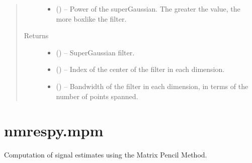 \documentclass[letterpaper,10pt,english]{sphinxmanual}
\begin{document}
\begin{fulllineitems}
\begin{quote}
\begin{description}
\begin{itemize}
\item {} 
\sphinxAtStartPar
{} (\sphinxstyleliteralemphasis{\sphinxupquote{, }}) – Power of the super\sphinxhyphen{}Gaussian. The greater the value, the more box\sphinxhyphen{}like
the filter.

\end{itemize}

\item[{Returns}] \leavevmode
\sphinxAtStartPar
\begin{itemize}
\item {} 
\sphinxAtStartPar
{} () – Super\sphinxhyphen{}Gaussian filter.

\item {} 
\sphinxAtStartPar
{} () – Index of the center of the filter in each dimension.

\item {} 
\sphinxAtStartPar
{} () – Bandwidth of the filter in each dimension, in terms of the number
of points spanned.

\end{itemize}


\end{description}\end{quote}

\end{fulllineitems}





\section{nmrespy.mpm}
\label{\detokenize{references/mpm:module-nmrespy.mpm}}\label{\detokenize{references/mpm:nmrespy-mpm}}\label{\detokenize{references/mpm::doc}}
\sphinxAtStartPar
Computation of signal estimates using the Matrix Pencil Method.
\end{document}
